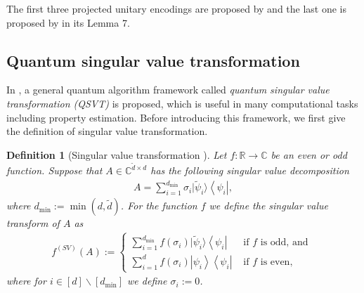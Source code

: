 \documentclass[journal]{IEEEtran}
\newtheorem{definition}{Definition}
\begin{document}
The first three projected unitary encodings are proposed by \cite{gilyen2019distributional} and the last one is proposed by \cite{low2019hamiltonian} in its Lemma 7.



\subsection{Quantum singular value transformation}


In \cite{gilyen2019singular}, a general quantum algorithm framework called \textit{quantum singular value transformation (QSVT)} is proposed, which is useful in many computational tasks including property estimation. Before introducing this framework, we first give the definition of singular value transformation.
\begin{definition}[Singular value transformation {\cite[Definition 16]{gilyen2019singular}}]
   Let $f\colon \mathbb{R} \rightarrow \mathbb{C}$ be an even or odd function. Suppose that $A \in \mathbb{C}^{\tilde{d} \times d}$ has the following singular value decomposition
  \begin{align}
    A=\sum_{i=1}^{d_{\min }} \sigma_{i}|\tilde{\psi}_{i}\rangle\left\langle\psi_{i}\right|,
  \end{align}
  where $d_{\min }:=\min (d, \tilde{d})$. For the function $f$ we define the singular value transform of $A$ as
  \begin{align}f^{(S V)}(A):= \begin{cases}\sum_{i=1}^{d_{\min }} f\left(\sigma_{i}\right)|\tilde{\psi}_{i}\rangle\left\langle\psi_{i}\right| & \text { if } f \text { is odd, and } \\ \sum_{i=1}^{d} f\left(\sigma_{i}\right)\left|\psi_{i}\right\rangle\left\langle\psi_{i}\right| & \text { if } f \text { is even}, \end{cases}\end{align}
  where for $i \in[d] \backslash\left[d_{\min }\right]$ we define $\sigma_{i}:=0$.
\end{definition}
\end{document}
